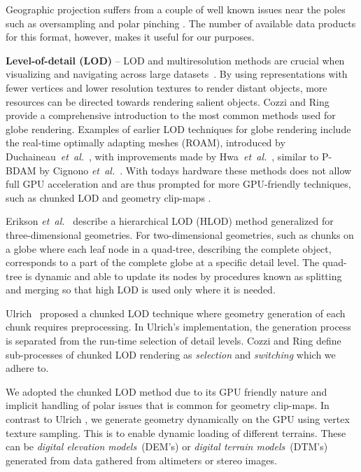 \documentclass[journal]{vgtc}                %
\newcommand{\etal}{\emph{et~al.}}
\begin{document}
Geographic projection suffers from a couple of well known issues near the poles such as oversampling and polar pinching \cite{cozzi20113d}. The number of available data products for this format, however, makes it useful for our purposes.

\noindent\textbf{Level-of-detail (LOD)} --
LOD and multiresolution methods are crucial when visualizing and navigating across large datasets~\cite{luebke2003level}.
By using representations with fewer vertices and lower resolution textures to render distant objects, more resources can be directed towards rendering salient objects.
Cozzi and Ring \cite{cozzi20113d} provide a comprehensive introduction to the most common methods used for globe rendering.
Examples of earlier LOD techniques for globe rendering include the real-time optimally adapting meshes (ROAM), introduced by Duchaineau~\etal~\cite{duchaineau1997roaming}, with improvements made by Hwa~\etal~\cite{hwa2005real}, similar to P-BDAM by Cignono \etal~\cite{cignoni2003planet,cignoni2003bdam}. With todays hardware these methods does not allow full GPU acceleration and are thus prompted for more GPU-friendly techniques, such as chunked LOD \cite{ulrich2002rendering} and geometry clip-maps \cite{losasso2004geometry}.

Erikson \etal~\cite{Erikson:2001:HFD:364338.364376} describe a hierarchical LOD (HLOD) method generalized for three-dimensional geometries. For two-dimensional geometries, such as chunks on a globe where each leaf node in a quad-tree, describing the complete object, corresponds to a part of the complete globe at a specific detail level.
The quad-tree is dynamic and able to update its nodes by procedures known as splitting and merging so that high LOD is used only where it is needed.

Ulrich~\cite{ulrich2002rendering} proposed a chunked LOD technique where geometry generation of each chunk requires preprocessing.
In Ulrich's implementation, the generation process is separated from the run-time selection of detail levels. Cozzi and Ring \cite{cozzi20113d} define sub-processes of chunked LOD rendering as \emph{selection} and \emph{switching} which we adhere to.


We adopted the chunked LOD method due to its GPU friendly nature and implicit handling of polar issues that is common for geometry clip-maps. In contrast to Ulrich \cite{ulrich2002rendering}, we generate geometry dynamically on the GPU using vertex texture sampling. This is to enable dynamic loading of different terrains. These can be \emph{digital elevation models}~(DEM's) or \emph{digital terrain models}~(DTM's) \cite{li2004digital} generated from data gathered from altimeters or stereo images.
\end{document}
